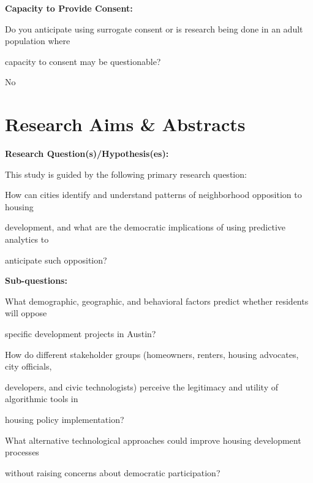 \documentclass[10pt, letterpaper]{article}
\begin{document}
\noindent \textbf{Capacity to Provide Consent:}

\vspace{0.5em}

\vspace{0.5em}

\begin{responsebox}

Do you anticipate using surrogate consent or is research being done in an adult population where

capacity to consent may be questionable?

No

\vspace{0.5em}

\vspace{0.5em}

\vspace{0.5em}

\end{responsebox}

\section*{Research Aims \& Abstracts}

\vspace{0.5em}

\noindent \textbf{Research Question(s)/Hypothesis(es):}

\begin{responsebox}

This study is guided by the following primary research question:

How can cities identify and understand patterns of neighborhood opposition to housing

development, and what are the democratic implications of using predictive analytics to

anticipate such opposition?

\end{responsebox}

\noindent \textbf{Sub-questions:}

\begin{responsebox}

What demographic, geographic, and behavioral factors predict whether residents will oppose

specific development projects in Austin?

How do different stakeholder groups (homeowners, renters, housing advocates, city officials,

developers, and civic technologists) perceive the legitimacy and utility of algorithmic tools in

housing policy implementation?

What alternative technological approaches could improve housing development processes

without raising concerns about democratic participation?

\end{responsebox}
\end{document}
